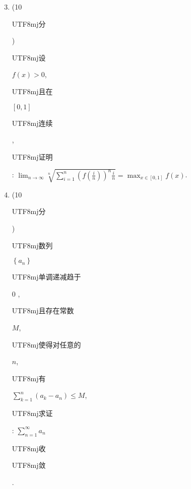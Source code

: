 \documentclass[10pt]{article}
\begin{document}
\begin{enumerate}
  \setcounter{enumi}{2}
  \item (10 \begin{CJK}{UTF8}{mj}分\end{CJK}) \begin{CJK}{UTF8}{mj}设\end{CJK} $f(x)>0$, \begin{CJK}{UTF8}{mj}且在\end{CJK} $[0,1]$ \begin{CJK}{UTF8}{mj}连续\end{CJK}, \begin{CJK}{UTF8}{mj}证明\end{CJK}: $\lim _{n \rightarrow \infty} \sqrt[n]{\sum_{i=1}^{n}\left(f\left(\frac{i}{n}\right)\right)^{n} \frac{i}{n}}=\max _{x \in[0,1]} f(x)$.

  \item (10 \begin{CJK}{UTF8}{mj}分\end{CJK}) \begin{CJK}{UTF8}{mj}数列\end{CJK} $\left\{a_{n}\right\}$ \begin{CJK}{UTF8}{mj}单调递减趋于\end{CJK} 0 , \begin{CJK}{UTF8}{mj}且存在常数\end{CJK} $M$, \begin{CJK}{UTF8}{mj}使得对任意的\end{CJK} $n$, \begin{CJK}{UTF8}{mj}有\end{CJK} $\sum_{k=1}^{n}\left(a_{k}-a_{n}\right) \leqslant M$, \begin{CJK}{UTF8}{mj}求证\end{CJK}: $\sum_{n=1}^{\infty} a_{n}$ \begin{CJK}{UTF8}{mj}收\end{CJK} \begin{CJK}{UTF8}{mj}敛\end{CJK}.


\end{enumerate}
\end{document}
